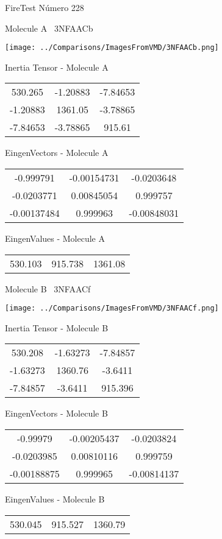\vtab[-3cm]
\begin{center}
{\large FireTest \tab Número 228}
\end{center}
\begin{multicols}{2}
\begin{center}

Molecule A \
3NFAACb

\texttt{[image: ../Comparisons/ImagesFromVMD/3NFAACb.png]}

Inertia Tensor - Molecule A \\
\begin{tabular}{|c c c|}
530.265	 & 	-1.20883	 & 	-7.84653	 \\
-1.20883	 & 	1361.05	 & 	-3.78865	 \\
-7.84653	 & 	-3.78865	 & 	915.61
\end{tabular}

\vtab
 EingenVectors - Molecule A     \\
\begin{tabular}{|c c c|}
-0.999791	 & 	-0.00154731	 & 	-0.0203648	 \\
-0.0203771	 & 	0.00845054	 & 	0.999757	 \\
-0.00137484	 & 	0.999963	 & 	-0.00848031
\end{tabular}

\vtab
 EingenValues - Molecule A     \\
\begin{tabular}{|c c c|}
530.103	 & 	915.738	 & 	1361.08	 \\
\end{tabular}
\columnbreak

Molecule B \
3NFAACf

\texttt{[image: ../Comparisons/ImagesFromVMD/3NFAACf.png]}

Inertia Tensor - Molecule B \\
\begin{tabular}{|c c c|}
530.208	 & 	-1.63273	 & 	-7.84857	 \\
-1.63273	 & 	1360.76	 & 	-3.6411	 \\
-7.84857	 & 	-3.6411	 & 	915.396
\end{tabular}

\vtab
 EingenVectors - Molecule B     \\
\begin{tabular}{|c c c|}
-0.99979	 & 	-0.00205437	 & 	-0.0203824	 \\
-0.0203985	 & 	0.00810116	 & 	0.999759	 \\
-0.00188875	 & 	0.999965	 & 	-0.00814137
\end{tabular}

\vtab
 EingenValues - Molecule B     \\
\begin{tabular}{|c c c|}
530.045	 & 	915.527	 & 	1360.79	 \\
\end{tabular}

\end{center}
\end{multicols}

